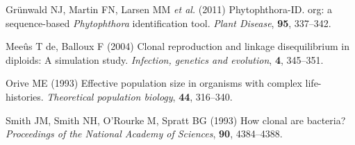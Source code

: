 \documentclass[double,12pt]{beavtex}
\begin{document}
  \hypertarget{ref-grunwald2011phytophthora}{}
  Grünwald NJ, Martin FN, Larsen MM \emph{et al.} (2011) Phytophthora-ID.
  org: a sequence-based \emph{Phytophthora} identification tool.
  \emph{Plant Disease}, \textbf{95}, 337--342.
  
  \hypertarget{ref-de2004clonal}{}
  Meeûs T de, Balloux F (2004) Clonal reproduction and linkage
  disequilibrium in diploids: A simulation study. \emph{Infection,
  genetics and evolution}, \textbf{4}, 345--351.
  
  \hypertarget{ref-orive1993effective}{}
  Orive ME (1993) Effective population size in organisms with complex
  life-histories. \emph{Theoretical population biology}, \textbf{44},
  316--340.
  
  \hypertarget{ref-smith1993how}{}
  Smith JM, Smith NH, O'Rourke M, Spratt BG (1993) How clonal are
  bacteria? \emph{Proceedings of the National Academy of Sciences},
  \textbf{90}, 4384--4388.
\end{document}

